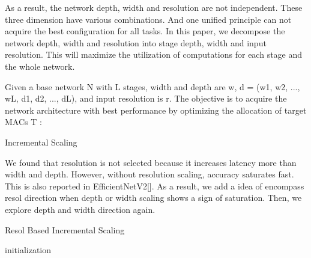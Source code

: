 As a result, the network depth, width and resolution are not independent. These three dimension have various combinations. And one unified principle can not acquire the best configuration for all tasks. In this paper, we decompose the network depth, width and resolution into stage depth, width and input resolution. This will maximize the utilization of computations for each stage and the whole network.


Given a base network N with L stages, width and depth are w, d = (w1, w2, ..., wL, d1, d2, ..., dL), and input resolution is r. The objective is to acquire the network architecture with best performance by optimizing the allocation of target MACs T :

\begin{algorithm}
    \caption{Incremental Scaling}\label{alg:IncrementalScaling}


\end{algorithm}


We found that resolution is not selected because it increases latency more than width and depth.
However, without resolution scaling, accuracy saturates fast. This is also reported in EfficientNetV2[].
As a result, we add a idea of encompass resol direction when depth or width scaling shows a sign of saturation.
Then, we explore depth and width direction again.
\begin{algorithm}
    \caption{Resol Based Incremental Scaling}\label{alg:ResolBasedIncrementalScaling}
     initialization\;

\end{algorithm}